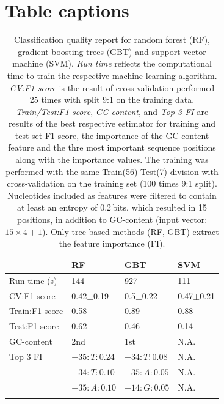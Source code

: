 \documentclass[utf8]{frontiersSCNS} %
\begin{document}
\section*{Table captions}
\begin{table}[h!]
    \caption{Classification quality report for random forest (RF), gradient boosting trees (GBT) and support vector machine (SVM). \textit{Run time} reflects the computational time to train the respective machine-learning algorithm. \textit{CV:F1-score} is the result of cross-validation performed 25 times with split 9:1 on the training data. \textit{Train/Test:F1-score}, \textit{GC-content}, and \textit{Top 3 FI} are results of the best respective estimator for training and test set F1-score, the importance of the GC-content feature and the thre most important sequence positions along with the importance values. The training was performed with the same Train(56)-Test(7) division with cross-validation on the training set (100 times 9:1 split). Nucleotides included as features were filtered to contain at least an entropy of 0.2\,bits, which resulted in 15 positions, in addition to GC-content (input vector: $15\times4+1$). Only tree-based methods (RF, GBT) extract the feature importance (FI). \label{Tab:PputML}}
    {
    \begin{tabular}{@{}l|l|l|l@{}}
        \toprule
                        & RF           & GBT           & SVM \\\hline%
        Run time (s)    & 144           & 927           & 111 \\\hline
        CV:F1-score     & 0.42$\pm$0.19 & 0.5$\pm$0.22 & 0.47$\pm$0.21\\\hline
        Train:F1-score  & 0.58          & 0.89          & 0.88 \\\hline
        Test:F1-score   & 0.62          & 0.46          & 0.14 \\\hline
        GC-content    & 2nd           & 1st           & N.A.\\\hline
        Top 3 FI        & $-35:T:0.24$  & $-34:T:0.08$  & N.A.\\
                        & $-34:T:0.10$  & $-35:A:0.05$  & N.A.\\
                        & $-35:A:0.10$  & $-14:G:0.05$  & N.A.\\\botrule
    \end{tabular}
    }
    {} %
\end{table}
\end{document}
